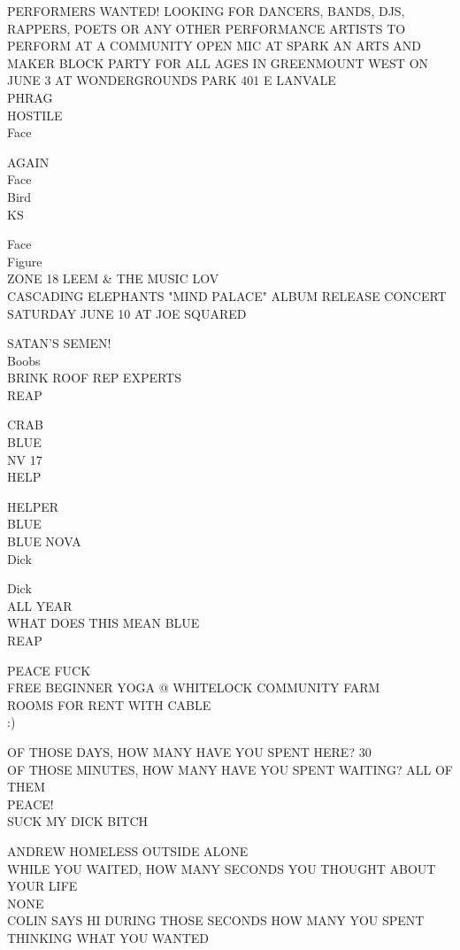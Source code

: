 \documentclass[10pt,letterpaper]{article}
\begin{document}
PERFORMERS WANTED!  LOOKING FOR DANCERS, BANDS, DJS, RAPPERS, POETS OR ANY OTHER PERFORMANCE ARTISTS TO PERFORM AT A COMMUNITY OPEN MIC AT SPARK AN ARTS AND MAKER BLOCK PARTY FOR ALL AGES IN GREENMOUNT WEST ON JUNE 3 AT WONDERGROUNDS PARK 401 E LANVALE\\
PHRAG\\
HOSTILE\\
Face

AGAIN\\
Face\\
Bird\\
KS

Face\\
Figure\\
ZONE 18 LEEM \& THE MUSIC LOV\\
CASCADING ELEPHANTS "MIND PALACE" ALBUM RELEASE CONCERT SATURDAY JUNE 10 AT JOE SQUARED

SATAN'S SEMEN!\\
Boobs\\
BRINK ROOF REP EXPERTS\\
REAP

CRAB\\
BLUE\\
NV 17\\
HELP

HELPER\\
BLUE\\
BLUE NOVA\\
Dick

Dick\\
ALL YEAR\\
WHAT DOES THIS MEAN BLUE\\
REAP

PEACE FUCK\\
FREE BEGINNER YOGA @ WHITELOCK COMMUNITY FARM\\
ROOMS FOR RENT WITH CABLE\\
:)

OF THOSE DAYS, HOW MANY HAVE YOU SPENT HERE?  30\\
OF THOSE MINUTES, HOW MANY HAVE YOU SPENT WAITING?  ALL OF THEM\\
PEACE!\\
SUCK MY DICK BITCH

ANDREW HOMELESS OUTSIDE ALONE\\
WHILE YOU WAITED, HOW MANY SECONDS YOU THOUGHT ABOUT YOUR LIFE\\
NONE\\
COLIN SAYS HI DURING THOSE SECONDS HOW MANY YOU SPENT THINKING WHAT YOU WANTED
\end{document}
